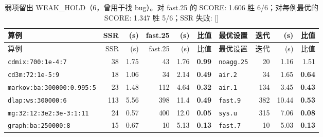 {\scriptsize\setlength{\tabcolsep}{3pt}
\begin{longtable}{lrrrrrlrrr}
\caption{弱项留出 WEAK\_HOLD（6，曾用于找 bug）。对 fast.25 的 SCORE: 1.606  胜 6/6；对每例最优的 SCORE: 1.347  胜 5/6；SSR 失败: []}\\
\toprule
算例 & SSR & (s) & fast.25 & (s) & 比值 & 最优设置 & 迭代 & (s) & 比值 \\
\midrule
\endfirsthead
\toprule
算例 & SSR & (s) & fast.25 & (s) & 比值 & 最优设置 & 迭代 & (s) & 比值 \\
\midrule
\endhead
\bottomrule
\endlastfoot
\texttt{cdmix:700:1e-4:7} & 38 & 1.75 & 43 & 1.76 & \textbf{0.99} & \texttt{noagg.25} & 20 & 1.16 & 1.51 \\
\texttt{cd3m:72:1e-5:9} & 18 & 1.06 & 34 & 2.14 & \textbf{0.49} & \texttt{air.2} & 34 & 1.65 & \textbf{0.64} \\
\texttt{markov:ba:300000:0.995:5} & 23 & 1.48 & 112 & 4.64 & \textbf{0.32} & \texttt{air.1} & 134 & 3.45 & \textbf{0.43} \\
\texttt{dlap:ws:300000:6} & 113 & 5.56 & 398 & 11.4 & \textbf{0.49} & \texttt{fast.9} & 382 & 10.44 & \textbf{0.53} \\
\texttt{mg:32:12:3e2:3e-3:1:11} & 24 & 0.57 & 400 & 12.0 & \textbf{0.05} & \texttt{sys.u} & 315 & 7.06 & \textbf{0.08} \\
\texttt{graph:ba:250000:8} & 15 & 0.67 & 10 & 5.13 & \textbf{0.13} & \texttt{fast.7} & 10 & 5.03 & \textbf{0.13} \\
\end{longtable}}
